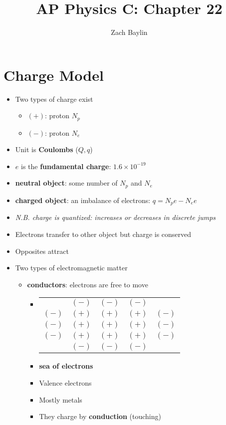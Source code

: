\documentclass{article}
\title{AP Physics C: Chapter 22}
\author{Zach Baylin}
\begin{document}
\maketitle
\section{Charge Model}
\begin{itemize}
  \item Two types of charge exist
    \begin{itemize}
      \item $(+)$: proton $N_p$
      \item $(-)$: proton $N_e$
    \end{itemize}
  \item Unit is \textbf{Coulombs} ($Q, q$)
  \item $e$ is the \textbf{fundamental charge}: $1.6\times10^{-19}$
  \item \textbf{neutral object}: some number of $N_p$ and $N_e$
  \item \textbf{charged object}: an imbalance of electrons: $q=N_p e - N_e e$
  \item \textit{N.B. charge is quantized: increases or decreases in discrete jumps}
  \item Electrons transfer to other object but charge is conserved
  \item Opposites attract
  \item Two types of electromagnetic matter
    \begin{itemize}
      \item \textbf{conductors}: electrons are free to move
        \begin{itemize}
          \item \begin{tabular}{ccccc}
                  & $(-)$ & $(-)$ & $(-)$ &     \\
            $(-)$ & $(+)$ & $(+)$ & $(+)$ & $(-)$ \\
            $(-)$ & $(+)$ & $(+)$ & $(+)$ & $(-)$ \\
            $(-)$ & $(+)$ & $(+)$ & $(+)$ & $(-)$ \\
                  & $(-)$ & $(-)$ & $(-)$ &    
          \end{tabular}
          \item \textbf{sea of electrons}
          \item Valence electrons
          \item Mostly metals
          \item They charge by \textbf{conduction} (touching)

\end{itemize}
\end{itemize}
\end{itemize}
\end{document}
